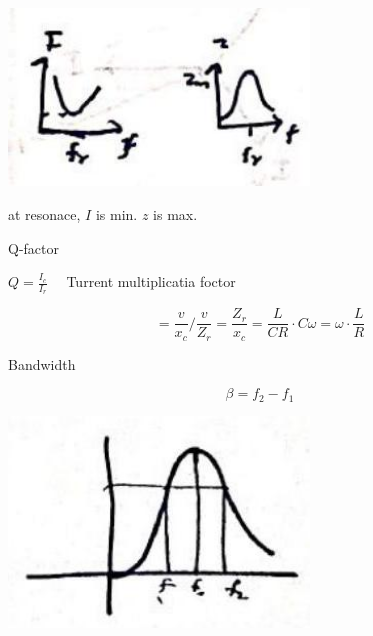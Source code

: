 \documentclass[12pt, a4paper]{article}
\newcommand{\figwidth}{8cm}
\begin{document}
	\begin{center}
		\includegraphics[max width=\figwidth]{2024_06_15_74bbabba7981675b0d49g-10(1)}
	\end{center}

	at resonace, $I$ is min. $z$ is max.

	Q-factor

$Q=\frac{I_{c}}{I_{r}} \quad$ Turrent multiplicatia foctor

$$
	=\frac{v}{x_{c}} / \frac{v}{Z_{r}}=\frac{Z_{r}}{x_{c}}=\frac{L}{C R} \cdot C \omega=\omega \cdot \frac{L}{R}
$$

Bandwidth

$$
	\beta=f_{2}-f_{1}
$$

\begin{center}
	\includegraphics[max width=\figwidth]{2024_06_15_74bbabba7981675b0d49g-10(2)}
\end{center}
\end{document}
